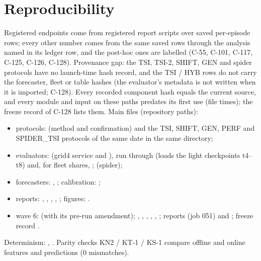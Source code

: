 \section{Reproducibility}\label{app:repro}
Registered endpoints come from registered report scripts over saved per-episode rows; every other number comes from the same saved rows
through the analysis named in its ledger row, and the post-hoc ones are labelled (C-55, C-101, C-117, C-125, C-126, C-128).
Provenance gap: the TSI, TSI-2, SHIFT, GEN and spider protocols have no launch-time hash record, and the TSI / HYB rows do not carry the
forecaster, fleet or table hashes (the evaluator's metadata is not written when it is imported; C-128). Every recorded component hash equals
the current source, and every module and input on these paths predates its first use (file times); the freeze record of C-128 lists them. Main files (repository paths):
\begin{itemize}\setlength\itemsep{0pt}
\item protocols:  (method and confirmation) and the TSI, SHIFT, GEN, PERF and
SPIDER\_TSI protocols of the same date in the same directory;
\item evaluators:  (grid4 service and ), run through
 (loads the light checkpoints t4--t8) and, for fleet shares, ;  (spider);
\item forecasters: , ; calibration: ;
\item reports: , , , ,
; figures: .
\item wave 6:  (with its pre-run amendment); ,
, , , , ; reports
 (job 051) and ; freeze record .
\end{itemize}
Determinism: , . Parity checks KN2 / KT-1 / KS-1 compare offline and online features and
predictions (0 mismatches).

